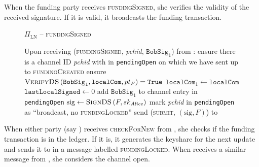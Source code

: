   When the funding party receives \textsc{fundingSigned}, she verifies the
  validity of the received signature. If it is valid, it broadcasts the funding
  transaction.

  \begin{figure}[H]
    \begin{protocolbox}{$\Pi_{\mathrm{LN}}$ -- \textsc{fundingSigned}}
      \begin{algorithmic}[1]
        \State Upon receiving (\textsc{fundingSigned}, \textit{pchid},
        $\mathtt{BobSig}_1$) from \bob:
        \Indent
          \State ensure there is a channel ID \textit{pchid} with \bob{} in
          \texttt{pendingOpen} on which we have sent up to
          \textsc{fundingCreated}
          \State ensure $\textsc{VerifyDS}\left(\mathtt{BobSig}_1,
          \mathtt{localCom}, p\redden{t}_F\right) = \mathtt{True}$
          \State $\mathtt{localCom}_1 \gets \mathtt{localCom}$
          \State $\mathtt{lastLocalSigned} \gets 0$
          \State add $\mathtt{BobSig}_1$ to channel entry in
          \texttt{pendingOpen}
          \State $\mathrm{sig} \gets \textsc{SignDS}\left(F,
          sk_{\mathit{Alice}}\right)$
          \State mark \textit{pchid} in \texttt{pendingOpen} as ``broadcast, no
          \textsc{fundingLocked}''
          \label{alg:protocol:open:fundingSigned:mark}
          \State send (\textsc{submit}, $\left(\mathrm{sig}, F\right)$) to
          \ledger
        \EndIndent
      \end{algorithmic}
    \end{protocolbox}
    \caption{}
    \label{alg:protocol:open:fundingSigned}
  \end{figure}

  When either party (say \alice) receives \textsc{checkForNew} from
  \environment, she checks if the funding transaction is in the ledger. If it
  is, it generates the keyshare for the next update and sends it to \bob{} in a
  message labelled \textsc{fundingLocked}. When \alice{} receives a similar
  message from \bob, she considers the channel open.

